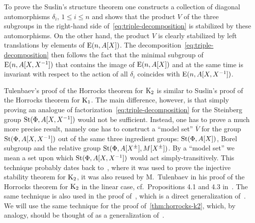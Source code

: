 To prove the Suslin's structure theorem one constructs a collection of diagonal automorphisms $\delta_i$, $1\leq i\leq n$
 and shows that the product $V$ of the three subgroups in the right-hand side of~\eqref{eq:triple-decomposition} is stabilized by these automorphisms.
On the other hand, the product $V$ is clearly stabilized by left translations by elements of $\operatorname{E}(n, A[X])$.
The decomposition~\eqref{eq:triple-decomposition} then follows the fact that the minimal subgroup of $\operatorname{E}(n, A[X, X^{-1}])$ that contains the image of $\operatorname{E}(n, A[X])$ and at the same time is invariant with respect to the action of all $\delta_i$
  coincides with $\operatorname{E}(n, A[X, X^{-1}])$.

Tulenbaev's proof of the Horrocks theorem for $\operatorname{K}_2$ is similar to Suslin's proof of the Horrocks theorem for $\operatorname{K}_1$.
The main difference, however, is that simply proving an analogue of factorization~\eqref{eq:triple-decomposition} for the Steinberg group $\operatorname{St}(\Phi, A[X, X^{-1}])$
 would not be sufficient.
Instead, one has to prove a much more precise result, namely one has to construct a ``model set'' $\overline{V}$ for the group $\operatorname{St}(\Phi, A[X, X^{-1}])$
 out of the same three ingredient groups: $\operatorname{St}(\Phi, A[X])$, Borel subgroup and the relative group $\operatorname{St}(\Phi, A[X^\pm], M[X^\pm])$.
By a ``model set'' we mean a set upon which $\operatorname{St}(\Phi, A[X, X^{-1}])$ would act simply-transitively.
This technique probably dates back to~\cite{ST76}, where it was used to prove the injective stability theorem for $\operatorname{K}_2$, it was also reused
 by M.~Tulenbaev in his proof of the Horrocks theorem for $\operatorname{K}_2$ in the linear case, cf.\ Propositions 4.1 and 4.3 in~\cite{Tu83}.
The same technique is also used in the proof of~\cite[Theorem~3]{LS20}, which is a direct generalization of~\cite[Proposition~4.3]{Tu83}.
We will use the same technique for the proof of~\cref{thm:horrocks-k2}, which, by analogy, should be thought of as a generalization of~\cite[Proposition~4.1]{Tu83}.


